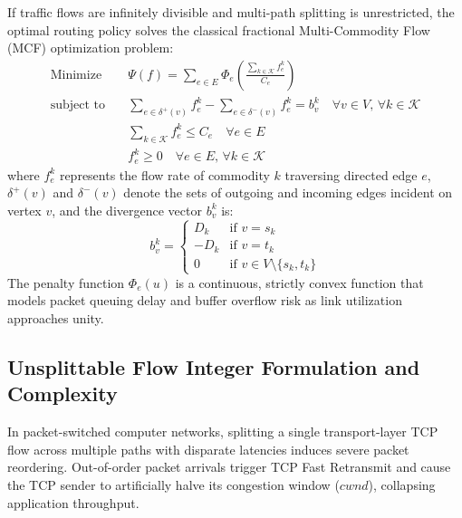 \documentclass[12pt,a4paper,oneside]{report}
\begin{document}
If traffic flows are infinitely divisible and multi-path splitting is unrestricted, the optimal routing policy solves the classical fractional Multi-Commodity Flow (MCF) optimization problem:
\begin{align}
    \text{Minimize} \quad & \Psi(f) = \sum_{e \in E} \Phi_e\left( \frac{\sum_{k \in \mathcal{K}} f_e^k}{C_e} \right) \label{eq:mcf_objective} \\
    \text{subject to} \quad & \sum_{e \in \delta^+(v)} f_e^k - \sum_{e \in \delta^-(v)} f_e^k = b_v^k \quad \forall v \in V, \, \forall k \in \mathcal{K} \label{eq:mcf_conservation} \\
    & \sum_{k \in \mathcal{K}} f_e^k \le C_e \quad \forall e \in E \label{eq:mcf_capacity} \\
    & f_e^k \ge 0 \quad \forall e \in E, \, \forall k \in \mathcal{K} \label{eq:mcf_nonnegative}
\end{align}
where $f_e^k$ represents the flow rate of commodity $k$ traversing directed edge $e$, $\delta^+(v)$ and $\delta^-(v)$ denote the sets of outgoing and incoming edges incident on vertex $v$, and the divergence vector $b_v^k$ is:
\begin{equation}
    b_v^k = \begin{cases}
        D_k & \text{if } v = s_k \\
        -D_k & \text{if } v = t_k \\
        0 & \text{if } v \in V \setminus \{s_k, t_k\}
    \end{cases}
\end{equation}
The penalty function $\Phi_e(u)$ is a continuous, strictly convex function that models packet queuing delay and buffer overflow risk as link utilization approaches unity.

\subsection{Unsplittable Flow Integer Formulation and Complexity}
In packet-switched computer networks, splitting a single transport-layer TCP flow across multiple paths with disparate latencies induces severe packet reordering. Out-of-order packet arrivals trigger TCP Fast Retransmit and cause the TCP sender to artificially halve its congestion window ($cwnd$), collapsing application throughput.
\end{document}
